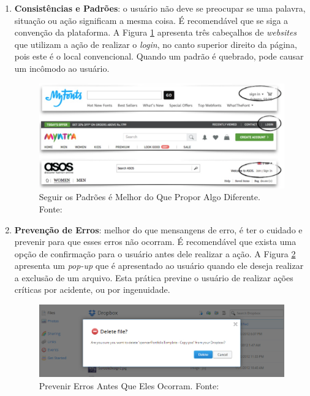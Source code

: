 \begin{enumerate}
  \item\textbf{Consistências e Padrões}: o usuário não deve se preocupar se uma palavra, situação ou ação significam a mesma coisa.
  É recomendável que se siga a convenção da plataforma. A Figura \ref{img:princ4} apresenta três cabeçalhos de \textit{websites} que utilizam a ação de realizar o \textit{login}, no canto superior direito da página, pois este é o local convencional. Quando um padrão é quebrado, pode causar um incômodo ao usuário.
   \graphicspath{{figuras/}}
  \begin{figure}[h!]
  \centering
  \includegraphics[scale=0.40]{princ_4.png}
  \caption{Seguir os Padrões é Melhor do Que Propor Algo Diferente. Fonte: \cite{pres_usabilidade}}
  \label{img:princ4}
  \end{figure}
  
  \item\textbf{Prevenção de Erros}: melhor do que mensangens de erro, é ter o cuidado e prevenir para que esses erros não ocorram. É recomendável que exista uma opção de confirmação para o usuário antes dele realizar a ação. A Figura \ref{img:princ5} apresenta um \textit{pop-up} que é apresentado ao usuário quando ele deseja realizar a exclusão de um arquivo. Esta prática previne o usuário de realizar ações críticas por acidente, ou por ingenuidade.
   \graphicspath{{figuras/}}
  \begin{figure}[h!]
  \centering
  \includegraphics[scale=0.40]{princ_5.jpg}
  \caption{Prevenir Erros Antes Que Eles Ocorram. Fonte: \cite{pres_usabilidade}}
  \label{img:princ5}
  \end{figure}


\end{enumerate}
